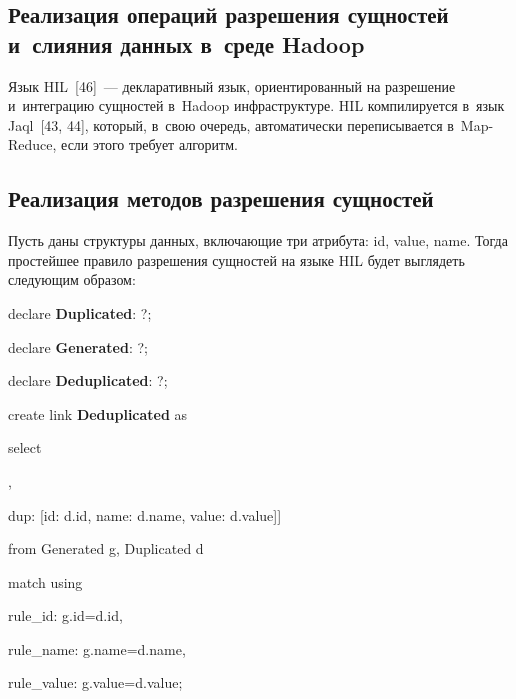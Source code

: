 \begin{multicols}{2}
\vspace*{-6pt}

\section{Реализация операций разрешения сущностей и~слияния
данных в~среде Hadoop}

\vspace*{-2pt}

  Язык HIL~[46]~--- декларативный язык, ориентированный
на разрешение и~интеграцию сущностей в~Hadoop инфраструктуре. HIL компилируется
в~язык Jaql~[43, 44], который, в~свою очередь, автоматически переписывается
  в~Map-Reduce, если этого требует алгоритм.

  \vspace*{-6pt}

  \subsection{Реализация методов разрешения сущностей}

  \vspace*{-2pt}

  Пусть даны структуры данных, включающие три атрибута: id, value, name. Тогда
простейшее правило разрешения сущностей на языке HIL будет выглядеть следующим
образом:

{\sf \noindent
  declare \textbf{Duplicated}: ?;

\noindent
  declare \textbf{Generated}: ?;

\noindent
  declare \textbf{Deduplicated}: ?;

  \vspace*{6pt}

\noindent
  create link \textbf{Deduplicated} as

\noindent
  select

\noindent
  [gen: [id: g.id, name: g.name, value: g.value],

\noindent
  dup: [id: d.id, name: d.name, value: d.value]]

\noindent
  from Generated g, Duplicated d

\noindent
  match using

\noindent
    \hspace*{3pt}rule\_id: g.id\;=\;d.id,

\noindent
    \hspace*{3pt}rule\_name: g.name\;=\;d.name,

\noindent
    \hspace*{3pt}rule\_value: g.value\;=\;d.value;
    }


\end{multicols}

